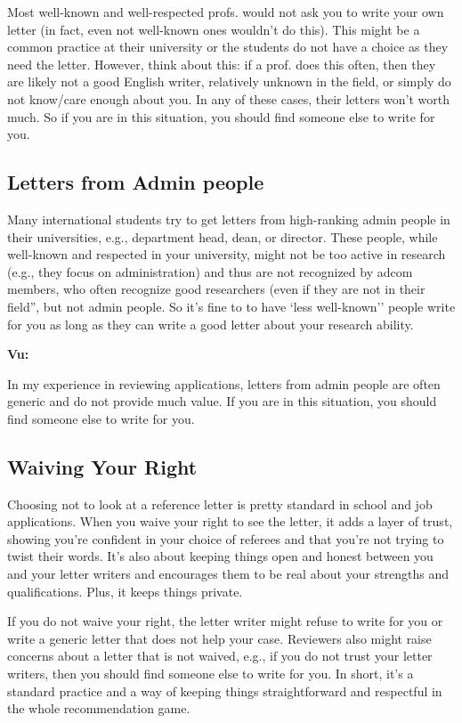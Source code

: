 \documentclass[oneside,11pt,dvipsnames]{book}
\newenvironment{commentbox}[1][]{
  \small
  \begin{mybox}
    {\small \textbf{#1}}
  }{
  \end{mybox}
}
\begin{document}
Most well-known and well-respected profs. would not ask you to write your own letter (in fact, even not well-known ones wouldn't do this). This might be a common practice at their university or the students do not have a choice as they need the letter.  However, think about this: if a prof. does this often, then they are likely not a good English writer, relatively unknown in the field, or simply do not know/care enough about you.  In any of these cases, their letters won't worth much. So if you are in this situation, you should find someone else to write for you.


\subsection{Letters from Admin people}\label{sec:admin-letters}


Many international students try to get letters from high-ranking admin people in their universities, e.g., department head, dean, or director.  These people, while well-known and respected in your university, might not be too active in research (e.g., they focus on administration) and thus are not recognized by adcom members, who often recognize good researchers (even if they are not in their field'', but not admin people. So it's fine to to have `less well-known'' people write for you as long as they can write a good letter about your research ability.

\begin{commentbox}[Vu:]
  In my experience in reviewing applications, letters from admin people are often generic and do not provide much value.  If you are in this situation, you should find someone else to write for you.
\end{commentbox}




\subsection{Waiving Your Right}  Choosing not to look at a reference letter is pretty standard in school and job applications. When you waive your right to see the letter, it adds a layer of trust, showing you're confident in your choice of referees and that you're not trying to twist their words. It's also about keeping things open and honest between you and your letter writers and encourages them to be real about your strengths and qualifications. Plus, it keeps things private.

If you do not waive your right,  the letter writer might refuse to write for you or write a generic letter that does not help your case.  Reviewers also might raise concerns about a letter that is not waived, e.g., if you do not trust your letter writers, then you should find someone else to write for you. In short, it's a standard practice and a way of keeping things straightforward and respectful in the whole recommendation game.
\end{document}
